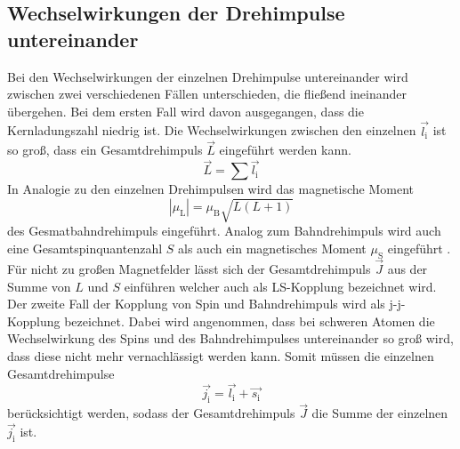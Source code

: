 \subsection{Wechselwirkungen der Drehimpulse untereinander}
Bei den Wechselwirkungen der einzelnen Drehimpulse untereinander wird zwischen zwei verschiedenen Fällen unterschieden, die fließend ineinander übergehen.  Bei dem ersten Fall wird davon ausgegangen, dass die Kernladungszahl niedrig ist. Die Wechselwirkungen zwischen den einzelnen $\vec{l_\text{i}}$ ist so groß, dass ein Gesamtdrehimpuls $\vec{L}$ eingeführt werden kann.
\begin{equation}
  \vec{L} = \sum \vec{l_\text{i}}
  \label{eqn:L}
\end{equation}
In Analogie zu den einzelnen Drehimpulsen wird das magnetische Moment
\begin{equation}
  |\mu_\text{L}| = \mu_\text{B} \sqrt{L(L+1)}
  \label{magL}
\end{equation}
des Gesmatbahndrehimpuls eingeführt. Analog zum Bahndrehimpuls wird auch eine Gesamtspinquantenzahl $S$ als auch ein magnetisches Moment $\mu_\text{S}$ eingeführt . Für nicht zu großen Magnetfelder lässt sich der Gesamtdrehimpuls $\vec{J}$ aus der Summe von $L$ und $S$ einführen welcher auch als LS-Kopplung bezeichnet wird.
Der zweite Fall der Kopplung von Spin und Bahndrehimpuls wird als j-j-Kopplung bezeichnet. Dabei wird angenommen, dass bei schweren Atomen die Wechselwirkung des Spins und des Bahndrehimpulses untereinander so groß wird, dass diese nicht mehr vernachlässigt werden kann. Somit müssen die einzelnen Gesamtdrehimpulse
\begin{equation}
  \vec{j_\text{i}} = \vec{l_\text{i}} + \vec{s_\text{i}}
  \label{eqn:j}
\end{equation}
berücksichtigt werden, sodass der Gesamtdrehimpuls $\vec{J}$ die Summe der einzelnen $\vec{j_\text{i}}$ ist.

